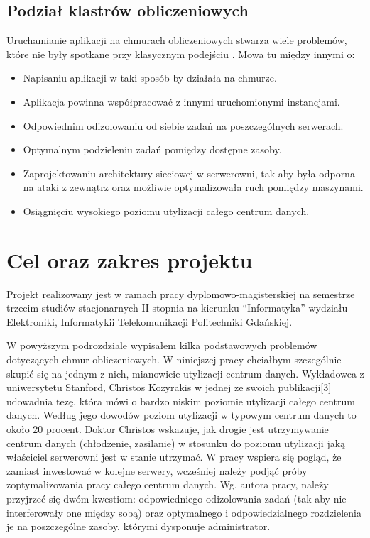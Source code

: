 \documentclass[10pt,a4paper,titlepage,twoside]{report}
\begin{document}
\subsection{Podział klastrów obliczeniowych}\indent \indent Uruchamianie aplikacji na chmurach obliczeniowych stwarza wiele problemów, które nie były spotkane przy klasycznym podejściu \cite{ad14}. Mowa tu między innymi o:
\begin{itemize}
	\item Napisaniu aplikacji w taki sposób by działała na chmurze.
	\item Aplikacja powinna współpracować z innymi uruchomionymi instancjami.
	\item Odpowiednim odizolowaniu od siebie zadań na poszczególnych serwerach.
	\item Optymalnym podzieleniu zadań pomiędzy dostępne zasoby.
	\item Zaprojektowaniu architektury sieciowej w serwerowni, tak aby była odporna na ataki z zewnątrz oraz możliwie optymalizowała ruch pomiędzy maszynami.
	\item Osiągnięciu wysokiego poziomu utylizacji całego centrum danych.
\end{itemize}

\section{Cel oraz zakres projektu}
\indent \indent Projekt realizowany jest w ramach pracy dyplomowo-magisterskiej na semestrze trzecim studiów stacjonarnych II stopnia na kierunku “Informatyka” wydziału Elektroniki, Informatykii Telekomunikacji Politechniki Gdańskiej.

W powyższym podrozdziale wypisałem kilka podstawowych problemów dotyczących chmur obliczeniowych. W niniejszej pracy chciałbym szczególnie skupić się na jednym z nich, mianowicie utylizacji centrum danych. Wykładowca z uniwersytetu Stanford, Christos Kozyrakis w jednej ze swoich publikacji[3] udowadnia tezę, która mówi o bardzo niskim poziomie utylizacji całego centrum danych. Według jego dowodów poziom utylizacji w typowym centrum danych to około 20 procent. Doktor Christos wskazuje, jak drogie jest utrzymywanie centrum danych (chłodzenie, zasilanie) w stosunku do poziomu utylizacji jaką właściciel serwerowni jest w stanie utrzymać. W pracy wspiera się pogląd, że zamiast inwestować w kolejne serwery, wcześniej należy podjąć próby zoptymalizowania pracy całego centrum danych. Wg. autora pracy, należy przyjrzeć się dwóm kwestiom: odpowiedniego odizolowania zadań (tak aby nie interferowały one między sobą) oraz optymalnego i odpowiedzialnego rozdzielenia je na poszczególne zasoby, którymi dysponuje administrator.
\end{document}

